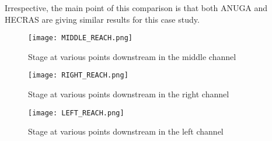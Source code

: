 Irrespective, the main point of this comparison is that both ANUGA and HECRAS
are giving similar results for this case study. 


\begin{figure}
\begin{center}
\texttt{[image: MIDDLE\_REACH.png]}
\end{center}
\caption{Stage at various points downstream in the middle channel}
\label{midReach}
\end{figure}

\begin{figure}
\begin{center}
\texttt{[image: RIGHT\_REACH.png]}
\end{center}
\caption{Stage at various points downstream in the right channel}
\end{figure}

\begin{figure}
\begin{center}
\texttt{[image: LEFT\_REACH.png]}
\end{center}
\caption{Stage at various points downstream in the left channel}
\label{leftReach}
\end{figure}


\endinput

